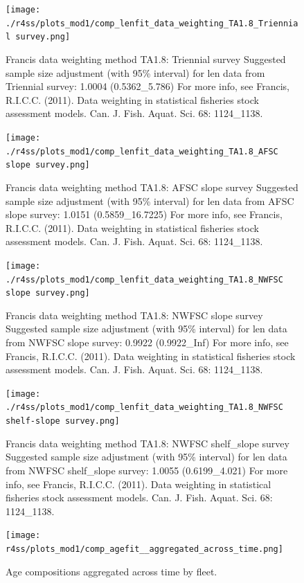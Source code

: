 \documentclass[12pt,]{article}
\begin{document}
\begin{figure}
\centering
\texttt{[image: ./r4ss/plots\_mod1/comp\_lenfit\_data\_weighting\_TA1.8\_Triennial survey.png]}
\caption{Francis data weighting method TA1.8: Triennial survey Suggested
sample size adjustment (with 95\% interval) for len data from Triennial
survey: 1.0004 (0.5362\_5.786) For more info, see Francis, R.I.C.C.
(2011). Data weighting in statistical fisheries stock assessment models.
Can. J. Fish. Aquat. Sci. 68: 1124\_1138.
\label{fig:weighting_len_triennial}}
\end{figure}

\begin{figure}
\centering
\texttt{[image: ./r4ss/plots\_mod1/comp\_lenfit\_data\_weighting\_TA1.8\_AFSC slope survey.png]}
\caption{Francis data weighting method TA1.8: AFSC slope survey
Suggested sample size adjustment (with 95\% interval) for len data from
AFSC slope survey: 1.0151 (0.5859\_16.7225) For more info, see Francis,
R.I.C.C. (2011). Data weighting in statistical fisheries stock
assessment models. Can. J. Fish. Aquat. Sci. 68: 1124\_1138.
\label{fig:weighting_len_afsc}}
\end{figure}

\begin{figure}
\centering
\texttt{[image: ./r4ss/plots\_mod1/comp\_lenfit\_data\_weighting\_TA1.8\_NWFSC slope survey.png]}
\caption{Francis data weighting method TA1.8: NWFSC slope survey
Suggested sample size adjustment (with 95\% interval) for len data from
NWFSC slope survey: 0.9922 (0.9922\_Inf) For more info, see Francis,
R.I.C.C. (2011). Data weighting in statistical fisheries stock
assessment models. Can. J. Fish. Aquat. Sci. 68: 1124\_1138.
\label{fig:weighting_len_nwfsc}}
\end{figure}

\begin{figure}
\centering
\texttt{[image: ./r4ss/plots\_mod1/comp\_lenfit\_data\_weighting\_TA1.8\_NWFSC shelf-slope survey.png]}
\caption{Francis data weighting method TA1.8: NWFSC shelf\_slope survey
Suggested sample size adjustment (with 95\% interval) for len data from
NWFSC shelf\_slope survey: 1.0055 (0.6199\_4.021) For more info, see
Francis, R.I.C.C. (2011). Data weighting in statistical fisheries stock
assessment models. Can. J. Fish. Aquat. Sci. 68: 1124\_1138.
\label{fig:weighting_len_nwfsccombo}}
\end{figure}

\FloatBarrier

\begin{figure}
\centering
\texttt{[image: r4ss/plots\_mod1/comp\_agefit\_\_aggregated\_across\_time.png]}
\caption{Age compositions aggregated across time by fleet.
\label{fig:age_agg}}
\end{figure}
\end{document}
